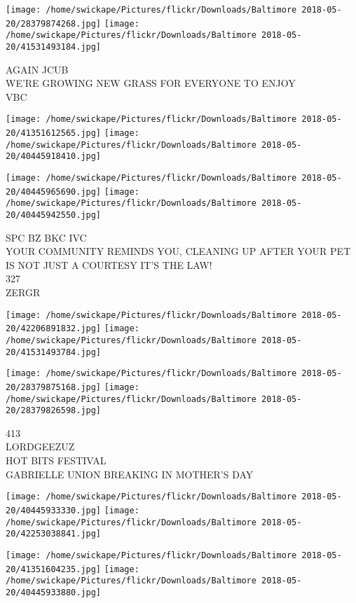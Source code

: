 \documentclass[10pt,letterpaper]{article}
\begin{document}
\vspace{0.25in}
\texttt{[image: /home/swickape/Pictures/flickr/Downloads/Baltimore 2018-05-20/28379874268.jpg]}
\texttt{[image: /home/swickape/Pictures/flickr/Downloads/Baltimore 2018-05-20/41531493184.jpg]}

AGAIN JCUB\\
WE'RE GROWING NEW GRASS FOR EVERYONE TO ENJOY\\
VBC
\pagebreak

\texttt{[image: /home/swickape/Pictures/flickr/Downloads/Baltimore 2018-05-20/41351612565.jpg]}
\texttt{[image: /home/swickape/Pictures/flickr/Downloads/Baltimore 2018-05-20/40445918410.jpg]}

\texttt{[image: /home/swickape/Pictures/flickr/Downloads/Baltimore 2018-05-20/40445965690.jpg]}
\texttt{[image: /home/swickape/Pictures/flickr/Downloads/Baltimore 2018-05-20/40445942550.jpg]}

SPC BZ BKC IVC\\
YOUR COMMUNITY REMINDS YOU, CLEANING UP AFTER YOUR PET IS NOT JUST A COURTESY IT'S THE LAW!\\
327\\
ZERGR
\pagebreak

\texttt{[image: /home/swickape/Pictures/flickr/Downloads/Baltimore 2018-05-20/42206891832.jpg]}
\texttt{[image: /home/swickape/Pictures/flickr/Downloads/Baltimore 2018-05-20/41531493784.jpg]}

\texttt{[image: /home/swickape/Pictures/flickr/Downloads/Baltimore 2018-05-20/28379875168.jpg]}
\texttt{[image: /home/swickape/Pictures/flickr/Downloads/Baltimore 2018-05-20/28379826598.jpg]}

413\\
LORDGEEZUZ\\
HOT BITS FESTIVAL\\
GABRIELLE UNION BREAKING IN MOTHER'S DAY
\pagebreak

\texttt{[image: /home/swickape/Pictures/flickr/Downloads/Baltimore 2018-05-20/40445933330.jpg]}
\texttt{[image: /home/swickape/Pictures/flickr/Downloads/Baltimore 2018-05-20/42253038841.jpg]}

\texttt{[image: /home/swickape/Pictures/flickr/Downloads/Baltimore 2018-05-20/41351604235.jpg]}
\texttt{[image: /home/swickape/Pictures/flickr/Downloads/Baltimore 2018-05-20/40445933880.jpg]}
\end{document}
